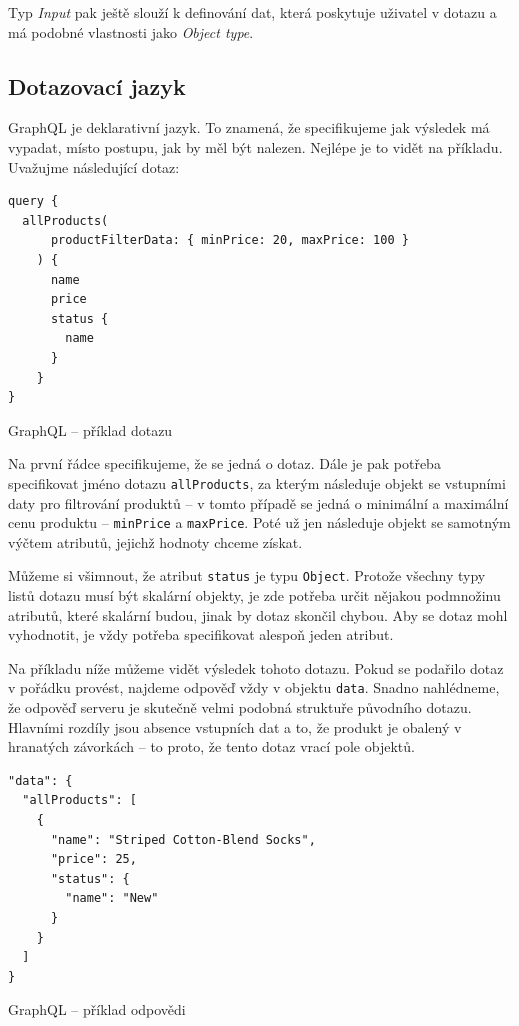 \documentclass[thesis=M,czech]{FITthesis}[2019/12/23]
\begin{document}
Typ \textit{Input} pak ještě slouží k definování dat, která poskytuje uživatel v dotazu a má podobné vlastnosti jako \textit{Object type}.

\subsection{Dotazovací jazyk}
GraphQL je deklarativní jazyk. To znamená, že specifikujeme jak výsledek má vypadat, místo postupu, jak by měl být nalezen. Nejlépe je to vidět na příkladu. Uvažujme následující dotaz:

\begin{listing}[H]
\begin{verbatim}
query {
  allProducts(
      productFilterData: { minPrice: 20, maxPrice: 100 }
    ) {
      name
      price
      status {
        name
      }
    }
}
\end{verbatim}
\caption{GraphQL -- příklad dotazu}
\label{lst:graphql_query_example}
\end{listing}

Na první řádce specifikujeme, že se jedná o dotaz. Dále je pak potřeba specifikovat jméno dotazu \texttt{allProducts}, za kterým následuje objekt se vstupními daty pro filtrování produktů -- v tomto případě se jedná o minimální a maximální cenu produktu -- \texttt{minPrice} a \texttt{maxPrice}. Poté už jen následuje objekt se samotným výčtem atributů, jejichž hodnoty chceme získat.

Můžeme si všimnout, že atribut \texttt{status} je typu \texttt{Object}. Protože všechny typy listů dotazu musí být skalární objekty, je zde potřeba určit nějakou podmnožinu atributů, které skalární budou, jinak by dotaz skončil chybou. Aby se dotaz mohl vyhodnotit, je vždy potřeba specifikovat alespoň jeden atribut.

Na příkladu níže můžeme vidět výsledek tohoto dotazu. Pokud se podařilo dotaz v pořádku provést, najdeme odpověď vždy v objektu \texttt{data}. Snadno nahlédneme, že odpověď serveru je skutečně velmi podobná struktuře původního dotazu. Hlavními rozdíly jsou absence vstupních dat a to, že produkt je obalený v hranatých závorkách -- to proto, že tento dotaz vrací pole objektů.

\begin{listing}[H]
\begin{verbatim}
"data": {
  "allProducts": [
    {
      "name": "Striped Cotton-Blend Socks",
      "price": 25,
      "status": {
        "name": "New"
      }
    }
  ]
}
\end{verbatim}
\caption{GraphQL -- příklad odpovědi}
\label{lst:graphql_example_response}
\end{listing}
\end{document}
